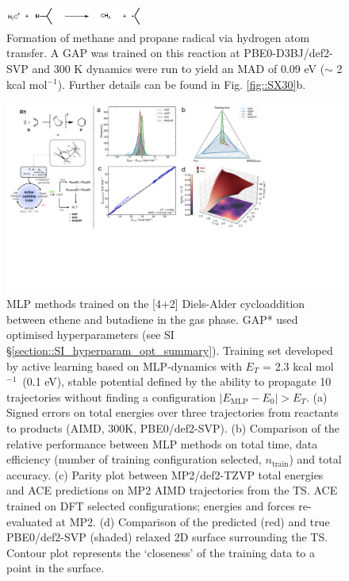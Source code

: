 \documentclass[twoside,twocolumn,9pt]{article}
\newcommand{\kcal}{kcal mol$^{-1}$}
\begin{document}
\begin{figure}[H]
	\centering
	\includegraphics[width=0.4\textwidth]{figX5}
	\caption{Formation of methane and propane radical via hydrogen atom transfer.  A GAP was trained on this reaction at PBE0-D3BJ/def2-SVP and 300 K dynamics were run to yield an MAD of 0.09 eV ($\sim$ 2 kcal mol$^{-1}$). Further details can be found in Fig. \ref{fig::SX30}b.}
	\label{fig::X5}
\end{figure}


\begin{figure}[tb]
	\centering
	\includegraphics[width=\textwidth]{figX1}
	\caption{MLP methods trained on the [4+2] Diels-Alder cycloaddition between ethene and butadiene in the gas phase. GAP* used optimised hyperparameters (see SI §\ref{section::SI_hyperparam_opt_summary}). Training set developed by active learning based on MLP-dynamics with $E_T$ = 2.3 \kcal~(0.1 eV), stable potential defined by the ability to propagate 10 trajectories without finding a configuration $|E_\text{MLP} - E_0| > E_T$. (a) Signed errors on total energies over three trajectories from reactants to products (AIMD, 300K, PBE0/def2-SVP). (b) Comparison of the relative performance between MLP methods on total time, data efficiency (number of training configuration selected, $n_\text{train}$) and total accuracy. (c) Parity plot between MP2/def2-TZVP total energies and ACE predictions on MP2 AIMD trajectories from the TS. ACE trained on DFT selected configurations; energies and forces re-evaluated at MP2. (d) Comparison of the predicted (red) and true PBE0/def2-SVP (shaded) relaxed 2D surface surrounding the TS. Contour plot represents the ‘closeness’ of the training data to a point in the surface.}
	\label{fig::X1}
\end{figure}
\end{document}
